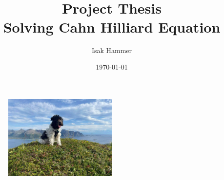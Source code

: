 \documentclass{article}
\title{Project Thesis\\ Solving Cahn Hilliard Equation}
\author{Isak Hammer }
\date{\today}
\begin{document}
    \begin{titlepage}
        \maketitle
        \begin{figure}
        \centering
        \includegraphics[width=0.5\textwidth]{figures/front_page/molly.jpeg}\\
        \end{figure}
        \thispagestyle{empty}
    \end{titlepage}

    \newpage
    \label{sec:eyyy}

    
    
    

    \printbibliography
\end{document}
